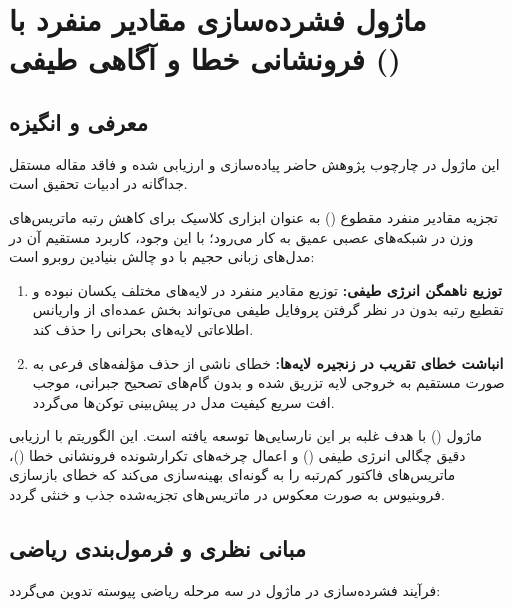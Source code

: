 \section{ماژول فشرده‌سازی مقادیر منفرد با فرونشانی خطا و آگاهی طیفی ()}
\label{sec:saes_svd_v2}

\subsection{معرفی و انگیزه}
این ماژول در چارچوب پژوهش حاضر پیاده‌سازی و ارزیابی شده و فاقد مقاله مستقل جداگانه در ادبیات تحقیق است.

تجزیه مقادیر منفرد مقطوع () به عنوان ابزاری کلاسیک برای کاهش رتبه ماتریس‌های وزن در شبکه‌های عصبی عمیق به کار می‌رود؛ با این وجود، کاربرد مستقیم آن در مدل‌های زبانی حجیم با دو چالش بنیادین روبرو است:
\begin{enumerate}
    \item \textbf{توزیع ناهمگن انرژی طیفی:} توزیع مقادیر منفرد در لایه‌های مختلف یکسان نبوده و تقطیع رتبه بدون در نظر گرفتن پروفایل طیفی می‌تواند بخش عمده‌ای از واریانس اطلاعاتی لایه‌های بحرانی را حذف کند.
    \item \textbf{انباشت خطای تقریب در زنجیره لایه‌ها:} خطای ناشی از حذف مؤلفه‌های فرعی به صورت مستقیم به خروجی لایه تزریق شده و بدون گام‌های تصحیح جبرانی، موجب افت سریع کیفیت مدل در پیش‌بینی توکن‌ها می‌گردد.
\end{enumerate}

ماژول  () با هدف غلبه بر این نارسایی‌ها توسعه یافته است. این الگوریتم با ارزیابی دقیق چگالی انرژی طیفی () و اعمال چرخه‌های تکرارشونده فرونشانی خطا ()، ماتریس‌های فاکتور کم‌رتبه را به گونه‌ای بهینه‌سازی می‌کند که خطای بازسازی فروبنیوس به صورت معکوس در ماتریس‌های تجزیه‌شده جذب و خنثی گردد.

\subsection{مبانی نظری و فرمول‌بندی ریاضی}
فرآیند فشرده‌سازی در ماژول  در سه مرحله ریاضی پیوسته تدوین می‌گردد:

